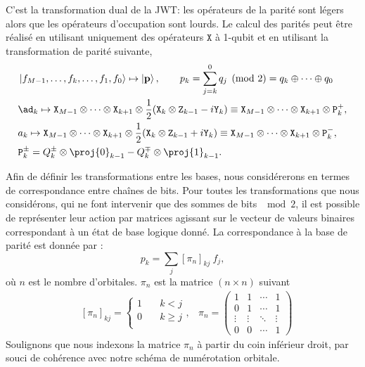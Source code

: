 \documentclass[12pt,a4paper]{article} %
\numberwithin{equation}{section} %
\numberwithin{figure}{section} %
\numberwithin{table}{section} %
\begin{document}
C'est la transformation dual de la JWT: les opérateurs de la parité sont légers alors que les opérateurs d'occupation sont lourds. Le calcul des parités peut être réalisé en utilisant uniquement des opérateurs $\mathtt{X}$ à 1-qubit et en utilisant la transformation de parité suivante,
\begin{align}
&\ket{f_{M-1},\dots,f_k,\dots, f_1,f_0} \mapsto \ket{\mathbf{p}} , \qquad p_k = \sum_{j=k}^0 q_j \pmod 2 = q_k\oplus\dots\oplus q_0\\
& \ad_k \mapsto \mathtt{X}_{M-1} \otimes \dots \otimes \mathtt{X}_{k+1} \otimes
\frac12(\mathtt{X}_k\otimes \mathtt{Z}_{k-1} - i \mathtt{Y}_k)\equiv \mathtt{X}_{M-1} \otimes \dots \otimes \mathtt{X}_{k+1} \otimes \mathtt{P}_k^+,\\
& a_k \mapsto \mathtt{X}_{M-1} \otimes \dots \otimes \mathtt{X}_{k+1} \otimes
\frac12(\mathtt{X}_k\otimes \mathtt{Z}_{k-1} + i \mathtt{Y}_k)\equiv \mathtt{X}_{M-1} \otimes \dots \otimes \mathtt{X}_{k+1} \otimes \mathtt{P}_k^-,\\
&\mathtt{P}_k^\pm =Q^\pm_k \otimes \proj{0}_{k-1} - Q^\mp_k \otimes \proj{1}_{k-1} .
\end{align}

Afin de définir les transformations entre les bases, nous considérerons en termes de correspondance entre chaînes de bits. Pour
toutes les transformations que nous considérons, qui ne font intervenir que des sommes de bits $\mod 2$, il est possible de représenter leur action par matrices agissant sur le vecteur de valeurs binaires correspondant à un état de base logique donné. La correspondance à la base de parité est donnée par :
$$ p_k = \sum_j [ \pi_n]_{kj}\ f_j,$$
où $n$ est le nombre d'orbitales. $\pi_n$ est la matrice $(n\times n)$ suivant
\begin{align}
 & [\pi_n]_{kj} =  
  \begin{cases}
    1 & \quad k < j \\
    0 & \quad k \geq j\\
  \end{cases} ,
  &  \pi_n = 
 \begin{pmatrix}
  1 & 1 & \cdots & 1 \\
  0 & 1 & \cdots & 1 \\
  \vdots  & \vdots  & \ddots & \vdots  \\
  0 & 0 & \cdots & 1
 \end{pmatrix}
\end{align}
Soulignons que nous indexons la matrice $\pi_n$ à partir du coin inférieur droit, par souci de cohérence avec notre schéma de numérotation orbitale. 
\end{document}
